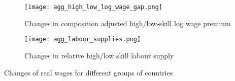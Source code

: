 \documentclass{article}
\begin{document}
\begin{figure}[!htbp]%
    \centering
    {\texttt{[image: agg\_high\_low\_log\_wage\_gap.png]} }
    \caption{Changes in composition adjusted high/low-skill log wage premium}
    \label{agg_high_low_log_wage_gap}
\end{figure}


\begin{figure}[!htbp]%
    \centering
    {\texttt{[image: agg\_labour\_supplies.png]} }
    \caption{Changes in relative high/low skill labour supply}
    \label{agg_labour_supplies}
\end{figure}

\begin{table}[!htbp]
\centering 
\caption{Changes of real wages for different groups of countries}
\label{real_wage_changes_agg}
\begin{center}
\resizebox{\textwidth}{!}{


}
\end{center}
\end{table}
\end{document}

